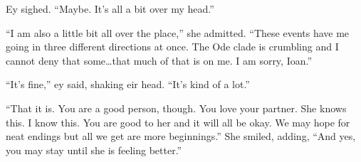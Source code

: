 Ey sighed. ``Maybe. It's all a bit over my head.''

``I am also a little bit all over the place,'' she admitted. ``These events have me going in three different directions at once. The Ode clade is crumbling and I cannot deny that some\ldots that much of that is on me. I am sorry, Ioan.''

``It's fine,'' ey said, shaking eir head. ``It's kind of a lot.''

``That it is. You are a good person, though. You love your partner. She knows this. I know this. You are good to her and it will all be okay. We may hope for neat endings but all we get are more beginnings.'' She smiled, adding, ``And yes, you may stay until she is feeling better.''
